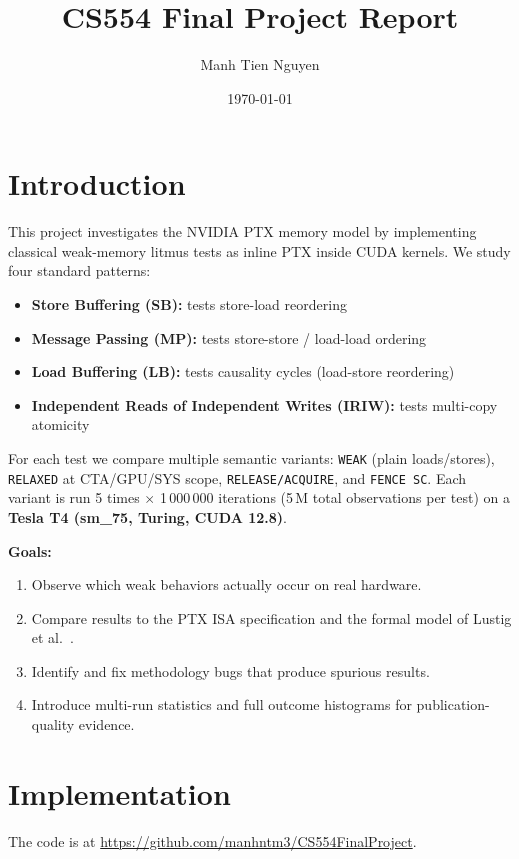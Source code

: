 \documentclass[a4paper]{article}
\title{CS554 Final Project Report}
\author{Manh Tien Nguyen}
\date{\today}
\begin{document}
\maketitle

\section{Introduction}

This project investigates the NVIDIA PTX memory model by implementing classical weak-memory litmus tests as inline PTX inside CUDA kernels.
We study four standard patterns:
\begin{itemize}
  \item \textbf{Store Buffering (SB):} tests store-load reordering
  \item \textbf{Message Passing (MP):} tests store-store / load-load ordering
  \item \textbf{Load Buffering (LB):} tests causality cycles (load-store reordering)
  \item \textbf{Independent Reads of Independent Writes (IRIW):} tests multi-copy atomicity
\end{itemize}

For each test we compare multiple semantic variants: \texttt{WEAK} (plain loads/stores), \texttt{RELAXED} at CTA/GPU/SYS scope, \texttt{RELEASE/ACQUIRE}, and \texttt{FENCE SC}.
Each variant is run 5 times $\times$ 1\,000\,000 iterations (5\,M total observations per test) on a \textbf{Tesla T4 (sm\_75, Turing, CUDA 12.8)}.

\bigskip\noindent\textbf{Goals:}
\begin{enumerate}
  \item Observe which weak behaviors actually occur on real hardware.
  \item Compare results to the PTX ISA specification and the formal model of Lustig et al.\ \cite{Lustig2019PTX}.
  \item Identify and fix methodology bugs that produce spurious results.
  \item Introduce multi-run statistics and full outcome histograms for publication-quality evidence.
\end{enumerate}

\section{Implementation}

The code is at \url{https://github.com/manhntm3/CS554FinalProject}.
\end{document}

